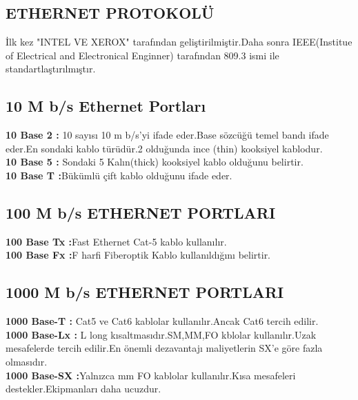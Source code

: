 \subsection*{ETHERNET PROTOKOLÜ}
İlk kez "INTEL VE XEROX" tarafından geliştirilmiştir.Daha sonra IEEE(Institue of Electrical and Electronical Enginner) tarafından 809.3 ismi ile standartlaştırılmıştır.
\subsection*{10 M b/s Ethernet Portları}
\textbf{10 Base 2 :} 10 sayısı 10 m b/s'yi ifade eder.Base sözcüğü temel bandı ifade eder.En sondaki kablo türüdür.2 olduğunda ince (thin) kooksiyel kablodur.\\
\textbf{10 Base 5 :} Sondaki 5 Kalın(thick) kooksiyel kablo olduğunu belirtir.\\
\textbf{10  Base T :}Bükümlü çift kablo olduğunu ifade eder.\\
\subsection*{100 M b/s ETHERNET PORTLARI}
\textbf{100 Base Tx :}Fast Ethernet Cat-5 kablo kullanılır.\\
\textbf{100 Base Fx :}F harfi Fiberoptik Kablo kullanıldığını belirtir.\\
\subsection*{1000 M b/s ETHERNET PORTLARI}
\textbf{1000 Base-T :} Cat5 ve Cat6 kablolar kullanılır.Ancak Cat6 tercih edilir.\\
\textbf{1000 Base-Lx :} L long kısaltmasıdır.SM,MM,FO kblolar kullanılır.Uzak mesafelerde tercih edilir.En önemli dezavantajı maliyetlerin SX'e göre fazla olmasıdır.\\
\textbf{1000 Base-SX :}Yalnızca mm FO kablolar kullanılır.Kısa mesafeleri destekler.Ekipmanları daha ucuzdur.\\
